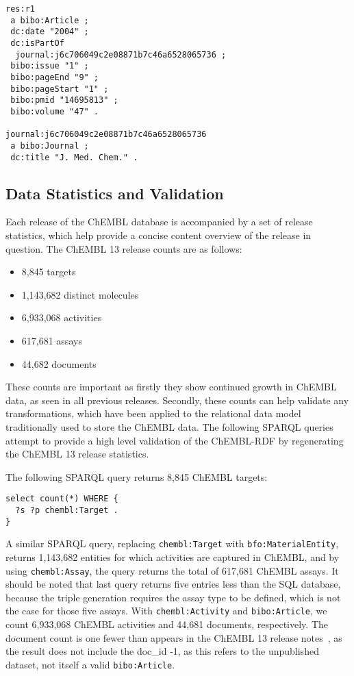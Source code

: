 \documentclass[10pt]{bmc_article}
\newenvironment{bmcformat}{\begin{raggedright}\baselineskip20pt\sloppy\setboolean{publ}{false}}{\end{raggedright}\baselineskip20pt\sloppy}
\begin{document}
\begin{bmcformat}
\begin{small}
\begin{verbatim}
res:r1
 a bibo:Article ;
 dc:date "2004" ;
 dc:isPartOf
  journal:j6c706049c2e08871b7c46a6528065736 ;
 bibo:issue "1" ;
 bibo:pageEnd "9" ;
 bibo:pageStart "1" ;
 bibo:pmid "14695813" ;
 bibo:volume "47" .

journal:j6c706049c2e08871b7c46a6528065736
 a bibo:Journal ;
 dc:title "J. Med. Chem." .
\end{verbatim}
\end{small}

\subsection*{Data Statistics and Validation}

Each release of the ChEMBL database is accompanied by a set of release statistics, which help 
provide a concise content overview of the release in question. The ChEMBL 13 release counts
are as follows:
\begin{itemize}
  \item 8,845 targets
  \item 1,143,682 distinct molecules
  \item 6,933,068 activities
  \item 617,681 assays
  \item 44,682 documents
\end{itemize}

These counts are important as firstly they show continued growth in ChEMBL data, as seen 
in all previous releases. Secondly, these counts can help validate any transformations, 
which have been applied to the relational data model traditionally used to store the ChEMBL 
data.  The following SPARQL queries attempt to provide a high level validation of the 
ChEMBL-RDF by regenerating the ChEMBL 13 release statistics.

The following SPARQL query returns 8,845 ChEMBL targets:
     
\begin{small}
\begin{verbatim}
select count(*) WHERE {
  ?s ?p chembl:Target .
}
\end{verbatim}
\end{small}

A similar SPARQL query, replacing \verb+chembl:Target+ with \verb+bfo:MaterialEntity+, returns 1,143,682 entities for which activities are captured in ChEMBL, and by using \verb+chembl:Assay+, the query returns the total of 617,681 ChEMBL assays.
It should be noted that last query returns five entries less than the SQL database, because the
triple generation requires the assay type to be defined, which is not the case for those 
five assays. With \verb+chembl:Activity+ and \verb+bibo:Article+, we count 6,933,068 ChEMBL activities and 44,681 documents,
respectively. The document count is one fewer than appears 
in the ChEMBL 13 release notes~\cite{ChEMBL13ReleaseNotes}, as the result does not include the doc\_id -1, as this refers to the 
unpublished dataset, not itself a valid \verb+bibo:Article+.


\end{bmcformat}
\end{document}
